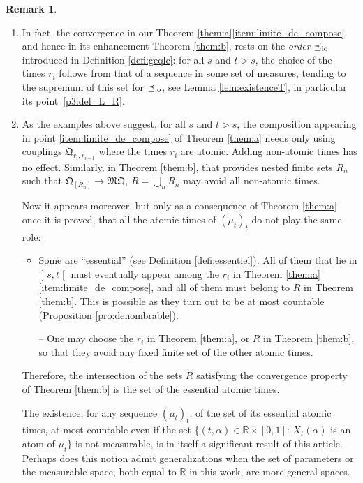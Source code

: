 \documentclass[JEP,XML,SOM,Unicode,NoEqCountersInSection,NoFloatCountersInSection,published]{cedram}
\theoremstyle{plain}
\theoremstyle{definition}
\newtheorem{rem}[them]{Remark}
\newcommand{\como}{\mathfrak{Q}}
\newcommand{\mq}{\mathfrak{MQ}}
\newcommand{\R}{\mathbb{R}}
\newcommand{\op}{\mathopen}
\newcommand{\clo}{\mathclose}
\newcommand{\leqlc}{\preceq_{\rm lo}}
\begin{document}
\skpt
\begin{rem}\label{rem:choix}
\begin{enumerate}
\item
In fact, the convergence in our Theorem \ref{them:a}\eqref{item:limite_de_compose}, and hence in its enhancement Theorem \ref{them:b}, rests on the \emph{order} $\leqlc$ introduced in Definition \ref{defi:geqlc}: for all $s$ and $t>s$, the choice of the times $r_i$ follows from that of a sequence in some set of measures, tending to the supremum of this set for $\leqlc$, see Lemma \ref{lem:existenceT}, in particular its point~\eqref{p3:def_L_R}.

\item
As the examples above suggest, for all $s$ and $t>s$, the composition appearing in point \eqref{item:limite_de_compose} of Theorem \ref{them:a} needs only using couplings $\como_{r_i,r_{i+1}}$ where the times $r_i$ are atomic. Adding non-atomic times has no effect. Similarly, in Theorem \ref{them:b}, that provides nested finite sets $R_n$ such that $\como_{[R_n]}\to\mq$, $R=\bigcup_nR_n$ may avoid all non-atomic times.

Now it appears moreover, but only as a consequence of Theorem \ref{them:a} once it is proved, that all the atomic times of $(\mu_t)_t$ do not play the same role:
\begin{itemize}
\item
Some are ``essential'' (see Definition \ref{defi:essentiel}). All of them that lie in $\op]s,t\clo[$ must eventually appear among the $r_i$ in Theorem \ref{them:a}\eqref{item:limite_de_compose}, and all of them must belong to $R$ in Theorem \ref{them:b}. This is possible as they turn out to be at most countable (Proposition \ref{pro:denombrable}).

-- One may choose the $r_i$ in Theorem \ref{them:a}, or $R$ in Theorem \ref{them:b}, so that they avoid any fixed finite set of the other atomic times.
\end{itemize}
Therefore, the intersection of the sets $R$ satisfying the convergence property of Theorem \ref{them:b} is the set of the essential atomic times.

The existence, for any sequence $(\mu_t)_t$, of the set of its essential atomic times, at most countable even if the set $\{(t,\alpha)\in\R\times[0,1]:\,X_t(\alpha)$ is an atom of $\mu_t\}$ is not measurable, is in itself a significant result of this article. Perhaps does this notion admit generalizations when the set of parameters or the measurable space, both equal to $\R$ in this work, are more general spaces.
\end{enumerate}
\end{rem}
\end{document}
